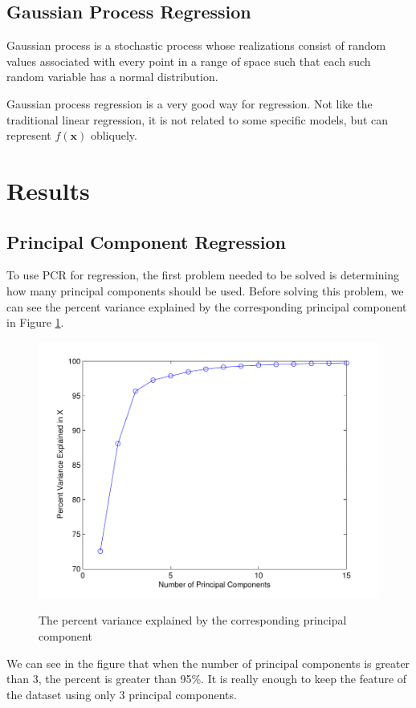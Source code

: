 \documentclass[a4paper]{article}
\newcommand{\bfx}{\mathbf{x}}
\begin{document}
\subsection{Gaussian Process Regression}
Gaussian process \cite{rasmussen2006gaussian} is a stochastic process whose realizations consist of random values associated with every point in a range of space such that each such random variable has a normal distribution. 

Gaussian process regression is a very good way for regression. Not like the traditional linear regression, it is not related to some specific models, but can represent $f(\bfx)$ obliquely.

\newpage
\section{Results}
\subsection{Principal Component Regression}
To use PCR for regression, the first problem needed to be solved is determining how many principal components should be used. Before solving this problem, we can see the percent variance explained by the corresponding principal component in Figure \ref{pcrb1}.
\begin{figure}[h]
  \centering
  \includegraphics[width=.6\textwidth]{images/explain_PCR.pdf}\\
  \caption{The percent variance explained by the corresponding principal component}\label{pcrb1}
\end{figure}

We can see in the figure that when the number of principal components is greater than 3, the percent is greater than 95\%. It is really enough to keep the feature of the dataset using only 3 principal components.
\end{document}
